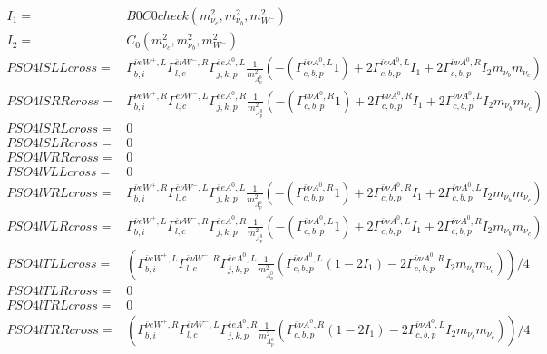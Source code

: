 \documentclass[A4,landscape]{article}
\begin{document}
\begin{align} 
I_1= & B0C0check(m^2_{\nu_{{c}}}, m^2_{\nu_{{b}}}, m^2_{W^-}) \\ 
I_2= & C_0(m^2_{\nu_{{c}}}, m^2_{\nu_{{b}}}, m^2_{W^-}) \\ 
  PSO4lSLLcross= &  \Gamma^{\bar{\nu}e W^+,L}_{b, i} \Gamma^{\bar{e}\nu W^- ,R}_{l, c} \Gamma^{\bar{e}e A^0 ,L}_{j, k, p} \frac{1}{m^2_{A^0_{{p}}}} (-(\Gamma^{\bar{\nu}\nu A^0 ,L}_{c, b, p} 1) + 2 \Gamma^{\bar{\nu}\nu A^0 ,L}_{c, b, p} I_1 + 2 \Gamma^{\bar{\nu}\nu A^0 ,R}_{c, b, p} I_2 m_{\nu_{{b}}} m_{\nu_{{c}}}) \\ 
  PSO4lSRRcross= &  \Gamma^{\bar{\nu}e W^+,R}_{b, i} \Gamma^{\bar{e}\nu W^- ,L}_{l, c} \Gamma^{\bar{e}e A^0 ,R}_{j, k, p} \frac{1}{m^2_{A^0_{{p}}}} (-(\Gamma^{\bar{\nu}\nu A^0 ,R}_{c, b, p} 1) + 2 \Gamma^{\bar{\nu}\nu A^0 ,R}_{c, b, p} I_1 + 2 \Gamma^{\bar{\nu}\nu A^0 ,L}_{c, b, p} I_2 m_{\nu_{{b}}} m_{\nu_{{c}}}) \\ 
  PSO4lSRLcross= & 0 \\ 
  PSO4lSLRcross= & 0 \\ 
  PSO4lVRRcross= & 0 \\ 
  PSO4lVLLcross= & 0 \\ 
  PSO4lVRLcross= &  \Gamma^{\bar{\nu}e W^+,R}_{b, i} \Gamma^{\bar{e}\nu W^- ,L}_{l, c} \Gamma^{\bar{e}e A^0 ,L}_{j, k, p} \frac{1}{m^2_{A^0_{{p}}}} (-(\Gamma^{\bar{\nu}\nu A^0 ,R}_{c, b, p} 1) + 2 \Gamma^{\bar{\nu}\nu A^0 ,R}_{c, b, p} I_1 + 2 \Gamma^{\bar{\nu}\nu A^0 ,L}_{c, b, p} I_2 m_{\nu_{{b}}} m_{\nu_{{c}}}) \\ 
  PSO4lVLRcross= &  \Gamma^{\bar{\nu}e W^+,L}_{b, i} \Gamma^{\bar{e}\nu W^- ,R}_{l, c} \Gamma^{\bar{e}e A^0 ,R}_{j, k, p} \frac{1}{m^2_{A^0_{{p}}}} (-(\Gamma^{\bar{\nu}\nu A^0 ,L}_{c, b, p} 1) + 2 \Gamma^{\bar{\nu}\nu A^0 ,L}_{c, b, p} I_1 + 2 \Gamma^{\bar{\nu}\nu A^0 ,R}_{c, b, p} I_2 m_{\nu_{{b}}} m_{\nu_{{c}}}) \\ 
  PSO4lTLLcross= & ( \Gamma^{\bar{\nu}e W^+,L}_{b, i} \Gamma^{\bar{e}\nu W^- ,R}_{l, c} \Gamma^{\bar{e}e A^0 ,L}_{j, k, p} \frac{1}{m^2_{A^0_{{p}}}} (\Gamma^{\bar{\nu}\nu A^0 ,L}_{c, b, p} (1 - 2 I_1) - 2 \Gamma^{\bar{\nu}\nu A^0 ,R}_{c, b, p} I_2 m_{\nu_{{b}}} m_{\nu_{{c}}}))/4 \\ 
  PSO4lTLRcross= & 0 \\ 
  PSO4lTRLcross= & 0 \\ 
  PSO4lTRRcross= & ( \Gamma^{\bar{\nu}e W^+,R}_{b, i} \Gamma^{\bar{e}\nu W^- ,L}_{l, c} \Gamma^{\bar{e}e A^0 ,R}_{j, k, p} \frac{1}{m^2_{A^0_{{p}}}} (\Gamma^{\bar{\nu}\nu A^0 ,R}_{c, b, p} (1 - 2 I_1) - 2 \Gamma^{\bar{\nu}\nu A^0 ,L}_{c, b, p} I_2 m_{\nu_{{b}}} m_{\nu_{{c}}}))/4 \\ 
\end{align} 
\end{document}
